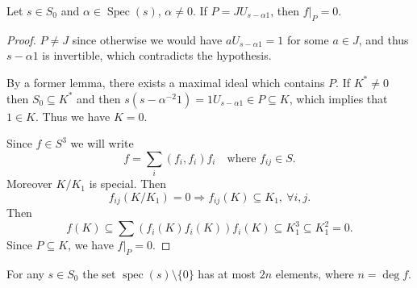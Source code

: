 \documentclass{article}
\begin{document}
\begin{lemma}
Let $s\in S_0$ and $\alpha\in\operatorname{Spec}(s)$, $\alpha\neq0$. If $P=JU_{s-\alpha1}$, then $f|_P=0$.
\end{lemma}

\begin{proof}
$P\neq J$ since otherwise we would have $aU_{s-\alpha1}=1$ for some $a\in J$, and thus $s-\alpha1$ is invertible, which contradicts the hypothesis.

By a former lemma, there exists a maximal ideal which contains $P$. If $K^*\neq0$ then $S_0\subseteq K^*$ and then $s(s-\alpha^{-2}1)=1U_{s-\alpha1}\in P\subseteq K$, which implies that $1\in K$. Thus we have $K=0$.

Since $f\in S^3$ we will write
\[
f=\sum_i(f_i,f_i)f_i\quad\text{where }f_{ij}\in S.
\]
Moreover $K/K_1$ is special. Then
\[
f_{ij}(K/K_1)=0\Rightarrow f_{ij}(K)\subseteq K_1,\ \forall i,j.
\]
Then
\[
f(K)\subseteq\sum(f_i(K)f_i(K))f_i(K)\subseteq K_1^3\subseteq K_1^2=0.
\]
Since $P\subseteq K$, we have $f|_P=0$.
\end{proof}

\begin{lemma}
For any $s \in S_0$ the set $\operatorname{spec}(s) \setminus \{0\}$ has at most $2n$ elements, where $n = \deg f$.
\end{lemma}
\end{document}
